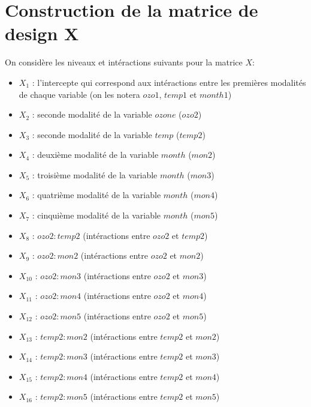 \documentclass[french,12pt]{report}
\newcommand{\<}{\langle}
\renewcommand{\>}{\rangle}
\theoremstyle{definition}
\begin{document}
\newpage

\section{Construction de la matrice de design X}

On considère les niveaux et intéractions suivants pour la matrice $X$:

\begin{itemize}
    \item $X_1$ : l'intercepte qui correspond aux intéractions entre les premières modalités de chaque variable (on les notera $ozo1$, $temp1$ et $month1$)
    \item $X_2$ : seconde modalité de la variable $ozone$ ($ozo2$)
    \item $X_3$ : seconde modalité de la variable $temp$ ($temp2$)
    \item $X_4$ : deuxième modalité de la variable $month$ ($mon2$)
    \item $X_5$ : troisième modalité de la variable $month$ ($mon3$)
    \item $X_6$ : quatrième modalité de la variable $month$ ($mon4$)
    \item $X_7$ : cinquième modalité de la variable $month$ ($mon5$)
    \item $X_8$ : $ozo2:temp2$ (intéractions entre $ozo2$ et $temp2$)
    \item $X_9$ : $ozo2:mon2$ (intéractions entre $ozo2$ et $mon2$)
    \item $X_{10}$ : $ozo2:mon3$ (intéractions entre $ozo2$ et $mon3$)
    \item $X_{11}$ : $ozo2:mon4$ (intéractions entre $ozo2$ et $mon4$)
    \item $X_{12}$ : $ozo2:mon5$ (intéractions entre $ozo2$ et $mon5$)
    \item $X_{13}$ : $temp2:mon2$ (intéractions entre $temp2$ et $mon2$)
    \item $X_{14}$ : $temp2:mon3$ (intéractions entre $temp2$ et $mon3$)
    \item $X_{15}$ : $temp2:mon4$ (intéractions entre $temp2$ et $mon4$)
    \item $X_{16}$ : $temp2:mon5$ (intéractions entre $temp2$ et $mon5$)
\end{itemize}

\vspace{5mm}
\end{document}
